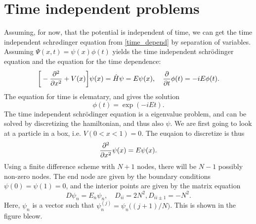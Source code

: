 \documentclass{article}
\begin{document}
\section*{Time independent problems}
    Assuming, for now, that the potential is independent of time, we can get the time independent schrødinger equation from \eqref{time_depend} by separation of variables. Assuming $\Psi(x, t) = \psi(x)\phi(t)$  yields the time independent schrödinger equation and the equation for the time dependence:
    \begin{equation}
        \bigg[-\pdv[2]{x} + V(x) \bigg] \psi(x) = \hat H \psi = E \psi(x), \quad \pdv{t}\phi(t) = -iE\phi(t).
    \end{equation}
    The equation for time is elematary, and gives the solution
    \begin{equation*}
        \phi(t) = \exp(-iEt).
    \end{equation*}
    The time independent schrödinger equation is a eigenvalue problem, and can be solved by discretizing the hamiltonian, and thus also $\psi$. We are first going to look at a particle in a box, i.e. $V(0<x<1) = 0$. The euqaion to discretize is thus
    \begin{equation*}
        \pdv[2]{x}\psi(x) = E \psi(x).
    \end{equation*}
    Using a finite difference scheme with $N + 1$ nodes, there will be $N-1$ possibly non-zero nodes. The end node are given by the boundary conditions $\psi(0) = \psi(1) = 0$, and the interior points are given by the matrix equation
    \begin{equation*}
        D \psi_n = E_n \psi_n, \quad D_{ii} = 2N^2, D_{ii\pm1} = -N^2.
    \end{equation*}
    Here, $\psi_n$ is a vector such that $\psi_n^{(j)} = \psi_n\big((j+1)/N\big)$. This is shown in the figure bleow.

    \begin{center}
    \end{center}
\end{document}
